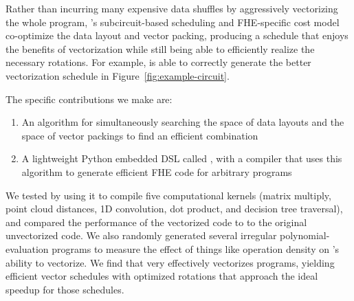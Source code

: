 Rather than incurring many expensive data shuffles by aggressively vectorizing the whole program, \system's subcircuit-based scheduling and FHE-specific cost model co-optimize the data layout and vector packing, producing a schedule that enjoys the benefits of vectorization while still being able to efficiently realize the necessary rotations. For example, \system is able to correctly generate the better vectorization schedule in Figure~\ref{fig:example-circuit}.





The specific contributions we make are:
\begin{enumerate}
    \item An algorithm for simultaneously searching the space of data layouts and the space of vector packings to find an efficient combination%
    \item A lightweight Python embedded DSL called \system, with a compiler that uses this algorithm to generate efficient FHE code for arbitrary programs
\end{enumerate}

We tested \system by using it to compile five computational kernels (matrix multiply, point cloud distances, 1D convolution, dot product, and decision tree traversal), and compared the performance of the vectorized code to to the original unvectorized code.
We also randomly generated several irregular polynomial-evaluation programs to measure the effect of things like operation density on \system's ability to vectorize. 
We find that \system very effectively vectorizes programs, yielding efficient vector schedules with optimized rotations that approach the ideal speedup for those schedules.

